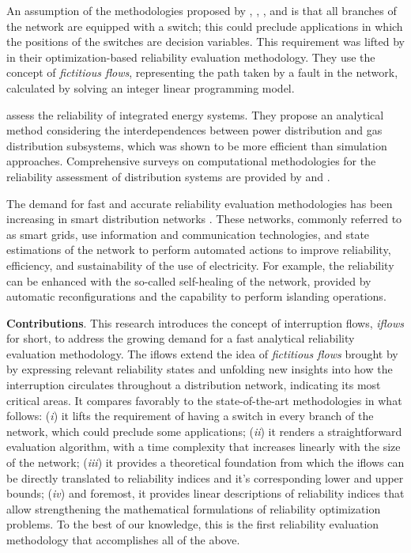 \documentclass{article}
\begin{document}
An assumption of the methodologies proposed by \cite{DelgadoContrerasArroyo2018}, \cite{TabaresEtal2019}, \cite{LiEtAl2020a}, and \cite{Contreras2020}  is that all branches of the network are equipped with a switch; this could preclude applications in which the positions of the switches are decision variables.
This requirement was lifted by \cite{LiEtAl2020b} in their optimization-based reliability evaluation methodology. They use the concept of \textit{fictitious flows}, representing the path taken by a fault in the network, calculated by solving an integer linear programming model.


\cite{JuanweiTaoYueXiaohuaBoBaomin2019} assess the reliability of integrated energy systems. They propose an analytical method considering the interdependences between power distribution and gas distribution subsystems, which was shown to be more efficient than simulation approaches.
Comprehensive surveys on computational methodologies for the reliability assessment of distribution systems are provided by \cite{Borges2012} and \cite{Lin2014}.

The demand for fast and accurate reliability evaluation methodologies has been increasing in smart distribution networks \cite{GhianiEtal2018}. These networks, commonly referred to as smart grids, use information and communication technologies, and state estimations of the network to perform automated actions to improve reliability, efficiency, and sustainability of the use of electricity. For example, the reliability can be enhanced with the so-called self-healing of the network, provided by automatic reconfigurations and the capability to perform islanding operations.


\textbf{Contributions}. This research introduces the concept of interruption flows, \textit{iflows} for short, to address the growing demand for a fast analytical reliability evaluation methodology.
The iflows extend the idea of \textit{fictitious flows} brought by \cite{LiEtAl2020b} by expressing relevant reliability states and unfolding new insights into how the interruption circulates throughout a distribution network, indicating its most critical areas. It compares favorably to the state-of-the-art methodologies  in what follows: (\textit{i}) it lifts the requirement of having a switch in every branch of the network, which could preclude some applications; (\textit{ii}) it renders a straightforward evaluation algorithm, with a time complexity that increases linearly with the size of the network; (\textit{iii}) it provides a theoretical foundation from which the iflows can be directly translated to reliability indices and it's corresponding lower and upper bounds; (\textit{iv}) and foremost, it provides linear descriptions of reliability indices that allow strengthening the mathematical formulations of reliability optimization problems. To the best of our knowledge, this is the first reliability evaluation methodology that accomplishes all of the above.
\end{document}
